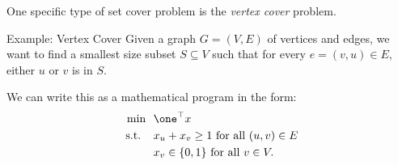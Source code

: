 %
%
%
%
%
%



One specific type of set cover problem is the \emph{vertex cover} problem.
\begin{general}{Example: Vertex Cover}{\npcomplete}
\label{ex:vertex-cover}
Given a graph $G = (V,E)$ of vertices and edges, we want to find a smallest size subset $S \subseteq V$ such that for every $e = (v,u) \in E$, either $u$ or $v$ is in $S$.   

We can write this as a mathematical program in the form:
\begin{equation}
\begin{split}
\min \ \ & \one^\top x\\
\st \ \ & x_u + x_v \geq 1 \text{ for all } (u,v) \in E \\ 
& x_v \in \{0,1\} \text{ for all } v \in V.
\end{split}
\end{equation}
\end{general}





